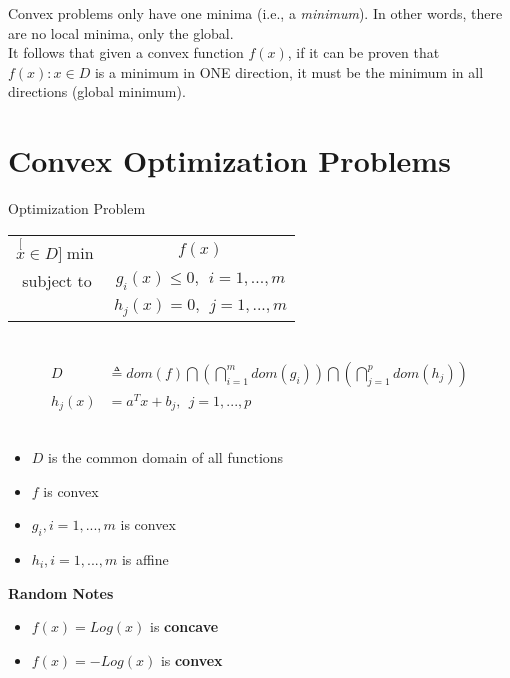 \documentclass{article}
\begin{document}
\begin{note}
  Convex problems only have one minima (i.e., a \textit{minimum}).
  In other words, there are no local minima, only the global.\newline
  \\
  It follows that given a convex function $f(x)$, if it can be proven that
  $f(x):x\in D$ is a minimum in ONE direction, it must be the minimum in all
  directions (global minimum).\\
\end{note}
\section{Convex Optimization Problems}
\begin{headered_box}{Optimization Problem}
  \begin{tabular}{ c c }
    $\stackrel[x\in D]{\min}{}$ & $f(x)$                     \\
    subject to                  & $g_i(x)\leq 0,~~i=1,...,m$ \\
                                & $h_j(x)=0,~~j=1,...,m$
  \end{tabular}\\
  \begin{align}
    D      & \triangleq dom(f)\bigcap\left(\bigcap_{i=1}^m dom(g_i)\right)\bigcap \left(\bigcap_{j=1}^p dom(h_j)\right) \\
    h_j(x) & =a^Tx+b_j,~~j=1,...,p
  \end{align}\\
  \begin{itemize}
    \item $D$ is the common domain of all functions
    \item $f$ is convex
    \item $g_i,i=1,...,m$ is convex
    \item $h_i,i=1,...,m$ is affine
  \end{itemize}
\end{headered_box}
\begin{flushleft}
  \textbf{Random Notes}\\
  \begin{itemize}
    \item $f(x)=Log(x)$ is \textbf{concave}
    \item $f(x)=-Log(x)$ is \textbf{convex}
  \end{itemize}
\end{flushleft}
\end{document}
